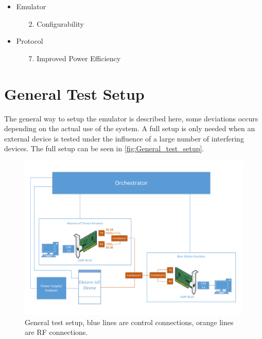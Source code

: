 \begin{itemize}
\item Emulator
	\begin{enumerate}
	\item[2.] Configurability %
	\end{enumerate}
\item Protocol
	\begin{enumerate}
	\item[7.] Improved Power Efficiency
	\end{enumerate}
\end{itemize}

\newpage

\section{General Test Setup}

The general way to setup the emulator is described here, some deviations occurs depending on the actual use of the system. A full setup is only needed when an external device is tested under the influence of a large number of interfering devices. The full setup can be seen in \autoref{fig:General_test_setup}.

\begin{figure}[H]
\centering
\includegraphics[width=\textwidth]{figures/General_test_setup.pdf}
\caption{General test setup, blue lines are control connections, orange lines are RF connections.}
\label{fig:General_test_setup}
\end{figure}

